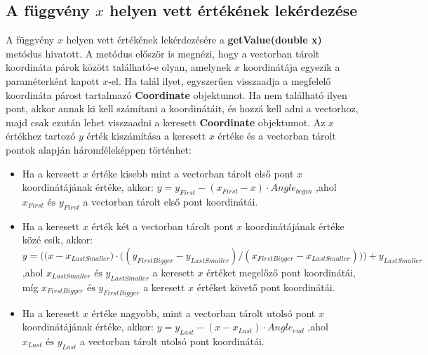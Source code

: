 \subsection{A függvény $x$ helyen vett értékének lekérdezése} \label{getValue}
A függvény $x$ helyen vett értékének lekérdezésére a \textbf{getValue(double x)} metódus hivatott. A metódus először is megnézi, hogy a vectorban tárolt koordináta párok között található-e olyan, amelynek $x$ koordinátája egyezik a paraméterként kapott $x$-el. Ha talál ilyet, egyszerűen visszaadja a megfelelő koordináta párost tartalmazó \textbf{Coordinate} objektumot. Ha nem található ilyen pont, akkor annak ki kell számítani a koordinátáit, és hozzá kell adni a vectorhoz, majd csak ezután lehet visszaadni a keresett \textbf{Coordinate} objektumot. Az $x$ értékhez tartozó $y$ érték kiszámítása a keresett $x$ értéke és a vectorban tárolt pontok alapján háromféleképpen történhet:
\begin{itemize}
\item Ha a keresett $x$ értéke kisebb mint a vectorban tárolt első pont $x$ koordinátájának értéke, akkor: 
$y=y_{First}-(x_{First}-x) \cdot Angle_{begin}$ ,ahol $x_{First} \text{ és } y_{First}$ a vectorban tárolt első pont koordinátái.
\item Ha a keresett $x$ érték két a vectorban tárolt pont $x$ koordinátájának értéke közé esik, akkor:
$y=\bigg(\big(x-x_{LastSmaller}\big) \cdot \big((y_{FirstBigger}-y_{LastSmaller})/(x_{FirstBigger}-x_{LastSmaller})\big)\bigg)+y_{LastSmaller}$ ,ahol $x_{LastSmaller} \text{ és } y_{LastSmaller}$ a keresett $x$ értéket megelőző pont koordinátái, míg $x_{FirstBigger} \text{ és } y_{FirstBigger}$ a keresett $x$ értéket követő pont koordinátái. 
\item Ha a keresett $x$ értéke nagyobb, mint a vectorban tárolt utolsó pont $x$ koordinátájának értéke, akkor:
$y=y_{Last}-(x-x_{Last}) \cdot Angle_{end}$ ,ahol $x_{Last} \text{ és } y_{Last}$ a vectorban tárolt utolsó pont koordinátái.
\end{itemize}
